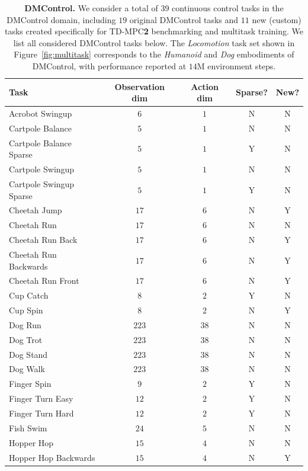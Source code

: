 \documentclass{article}
\begin{document}
\begin{table}[h!]
\centering
\parbox{\textwidth}{
\caption{\textbf{DMControl.} We consider a total of $39$ continuous control tasks in the DMControl domain, including $19$ original DMControl tasks and $11$ new (custom) tasks created specifically for TD-MPC\textbf{2} benchmarking and multitask training. We list all considered DMControl tasks below. The \emph{Locomotion} task set shown in Figure~\ref{fig:multitask} corresponds to the \emph{Humanoid} and \emph{Dog} embodiments of DMControl, with performance reported at $14$M environment steps.}
\label{tab:appendix-dmcontrol-tasks}
\centering
\vspace{-0.05in}
\begin{tabular}{lcccc}
\toprule
\textbf{Task} & \textbf{Observation dim} & \textbf{Action dim} & \textbf{Sparse?} & \textbf{New?} \\ \midrule
Acrobot Swingup & $6$ & $1$ & N & N \\
Cartpole Balance & $5$ & $1$& N & N \\
Cartpole Balance Sparse & $5$ & $1$ & Y & N \\
Cartpole Swingup & $5$ & $1$ & N & N \\
Cartpole Swingup Sparse & $5$ & $1$ & Y & N \\
Cheetah Jump & $17$ & $6$ & N & Y \\
Cheetah Run & $17$ & $6$ & N & N \\
Cheetah Run Back & $17$ & $6$ & N & Y \\
Cheetah Run Backwards & $17$ & $6$ & N & Y \\
Cheetah Run Front & $17$ & $6$ & N & Y \\
Cup Catch & $8$ & $2$ & Y & N \\
Cup Spin & $8$ & $2$ & N & Y \\
Dog Run & $223$ & $38$ & N & N \\
Dog Trot & $223$ & $38$ & N & N \\
Dog Stand & $223$ & $38$ & N & N \\
Dog Walk & $223$ & $38$ & N & N \\
Finger Spin & $9$ & $2$ & Y & N \\
Finger Turn Easy & $12$ & $2$ & Y & N \\
Finger Turn Hard & $12$ & $2$ & Y & N \\
Fish Swim & $24$ & $5$ & N & N \\
Hopper Hop & $15$ & $4$ & N & N \\
Hopper Hop Backwards & $15$ & $4$ & N & Y \\

\end{tabular}}
\end{table}
\end{document}
